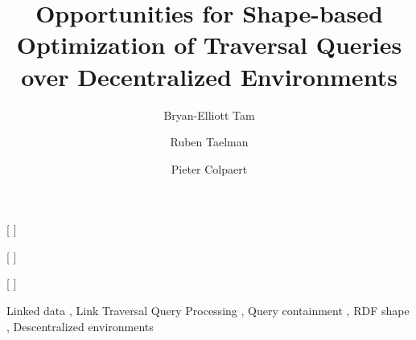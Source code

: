 \documentclass[
]{ceurart}
\begin{document}


\title{Opportunities for Shape-based Optimization of Traversal Queries over Decentralized Environments}


\author[1]{Bryan-Elliott Tam}[%
]

\author[1]{Ruben Taelman}[%
]
\author[1]{Pieter Colpaert}[%
]


\address[1]{IDLab,
Department of Electronics and Information Systems, Ghent University – imec}

\begin{keywords}
  Linked data \sep
  Link Traversal Query Processing \sep
  Query containment \sep
  RDF shape \sep
  Descentralized environments
\end{keywords}

\maketitle










\end{document}
